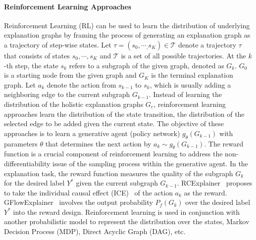 \paragraph{Reinforcement Learning Approaches}
Reinforcement Learning (RL) can be used to learn the distribution of underlying explanation graphs by framing the process of generating an explanation graph as a trajectory of step-wise states. Let $\tau=(s_0, \cdots_, s_K)\in\mathcal{T}$ denote a trajectory $\tau$ that consists of states $s_0, \cdots, s_K$ and $\mathcal{T}$ is a set of all possible trajectories. At the $k$-th step, the state $s_k$ refers to a subgraph of the given graph, denoted as $G_k$. $G_0$ is a starting node from the given graph and $G_K$ is the terminal explanation graph. Let $a_k$ denote the action from $s_{k-1}$ to $s_k$, which is usually adding a neighboring edge to the current subgraph $G_{k-1}$. Instead of learning the distribution of the holistic explanation graphs $G_e$, reinforcement learning approaches learn the distribution of the state transition, \ie the distribution of the selected edge to be added given the current state. The objective of these  approaches is to learn a generative agent (policy network) $g_\theta(G_{k-1})$ with parameters $\theta$ that determines the next action by $a_k\sim g_\theta(G_{k-1})$. The reward function is a crucial component of reinforcement learning to address the non-differentiability issue of the sampling process within the generative agent. In the explanation task, the reward function measures the quality of the subgraph $G_k$ for the desired label $Y^\ast$ given the current subgraph $G_{k-1}$. RCExplainer~\cite{RCExplainer} proposes to take the individual causal effect (ICE)~\cite{glymour2016causal} of the action $a_k$ as the reward. GFlowExplainer~\cite{GFlowExplainer} involves the output probability $P_f(G_k)$ over the desired label $Y^\ast$ into the reward design. Reinforcement learning is used in conjunction with another probabilistic model to represent the distribution over the states, \eg Markov Decision Process (MDP), Direct Acyclic Graph (DAG), etc.
